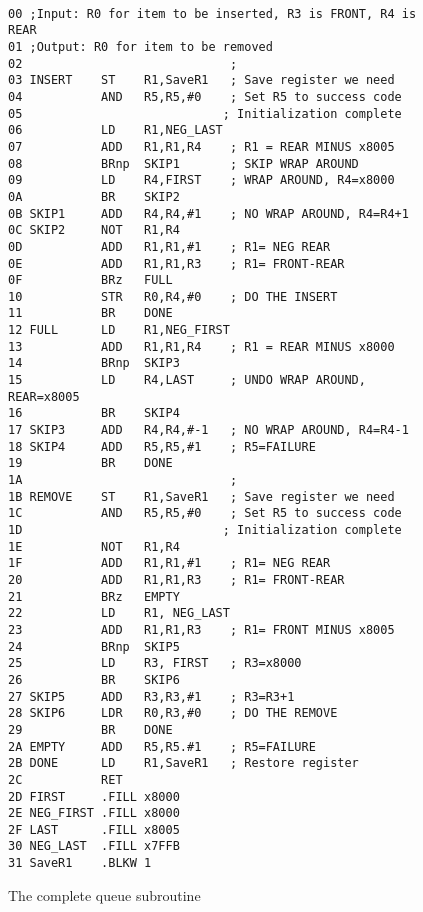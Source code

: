 \documentclass{patt}
\begin{document}
\begin{figure}[h!]
\begin{minipage}{36pc}
\begin{Verbatim}[fontsize=\fontsize{9}{11}\selectfont]

00 ;Input: R0 for item to be inserted, R3 is FRONT, R4 is REAR
01 ;Output: R0 for item to be removed
02                             ;
03 INSERT    ST    R1,SaveR1   ; Save register we need
04           AND   R5,R5,#0    ; Set R5 to success code
05                            ; Initialization complete                  
06           LD    R1,NEG_LAST    
07           ADD   R1,R1,R4    ; R1 = REAR MINUS x8005
08           BRnp  SKIP1       ; SKIP WRAP AROUND
09           LD    R4,FIRST    ; WRAP AROUND, R4=x8000
0A           BR    SKIP2
0B SKIP1     ADD   R4,R4,#1    ; NO WRAP AROUND, R4=R4+1
0C SKIP2     NOT   R1,R4
0D           ADD   R1,R1,#1    ; R1= NEG REAR
0E           ADD   R1,R1,R3    ; R1= FRONT-REAR
0F           BRz   FULL
10           STR   R0,R4,#0    ; DO THE INSERT
11           BR    DONE
12 FULL      LD    R1,NEG_FIRST
13           ADD   R1,R1,R4    ; R1 = REAR MINUS x8000
14           BRnp  SKIP3
15           LD    R4,LAST     ; UNDO WRAP AROUND, REAR=x8005
16           BR    SKIP4
17 SKIP3     ADD   R4,R4,#-1   ; NO WRAP AROUND, R4=R4-1
18 SKIP4     ADD   R5,R5,#1    ; R5=FAILURE
19           BR    DONE
1A                             ;
1B REMOVE    ST    R1,SaveR1   ; Save register we need
1C           AND   R5,R5,#0    ; Set R5 to success code
1D                            ; Initialization complete                  
1E           NOT   R1,R4
1F           ADD   R1,R1,#1    ; R1= NEG REAR
20           ADD   R1,R1,R3    ; R1= FRONT-REAR
21           BRz   EMPTY 
22           LD    R1, NEG_LAST
23           ADD   R1,R1,R3    ; R1= FRONT MINUS x8005
24           BRnp  SKIP5
25           LD    R3, FIRST   ; R3=x8000
26           BR    SKIP6
27 SKIP5     ADD   R3,R3,#1    ; R3=R3+1
28 SKIP6     LDR   R0,R3,#0    ; DO THE REMOVE      
29           BR    DONE
2A EMPTY     ADD   R5,R5.#1    ; R5=FAILURE
2B DONE      LD    R1,SaveR1   ; Restore register
2C           RET
2D FIRST     .FILL x8000
2E NEG_FIRST .FILL x8000
2F LAST      .FILL x8005
30 NEG_LAST  .FILL x7FFB
31 SaveR1    .BLKW 1

\end{Verbatim}
\caption{The complete queue subroutine}
\label{fig:complete.queue.subroutine}
\end{minipage}
\end{figure}
\end{document}
